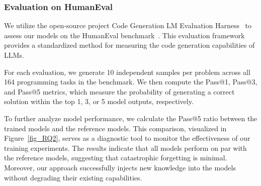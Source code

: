 






\subsubsection{Evaluation on HumanEval}
We utilize the open-source project Code Generation LM Evaluation Harness~\cite{bigcode-evaluation-harness} to assess our models on the HumanEval benchmark~\cite{chen2021humaneval}. This evaluation framework provides a standardized method for measuring the code generation capabilities of LLMs.

For each evaluation, we generate 10 independent samples per problem across all 164 programming tasks in the benchmark. We then compute the Pass@1, Pass@3, and Pass@5 metrics, which measure the probability of generating a correct solution within the top 1, 3, or 5 model outputs, respectively.

To further analyze model performance, we calculate the Pass@5 ratio between the trained models and the reference models. This comparison, visualized in Figure~\ref{fig_RQ2}, serves as a diagnostic tool to monitor the effectiveness of our training experiments. The results indicate that all models perform on par with the reference models, suggesting that catastrophic forgetting is minimal. Moreover, our approach successfully injects new knowledge into the models without degrading their existing capabilities.

